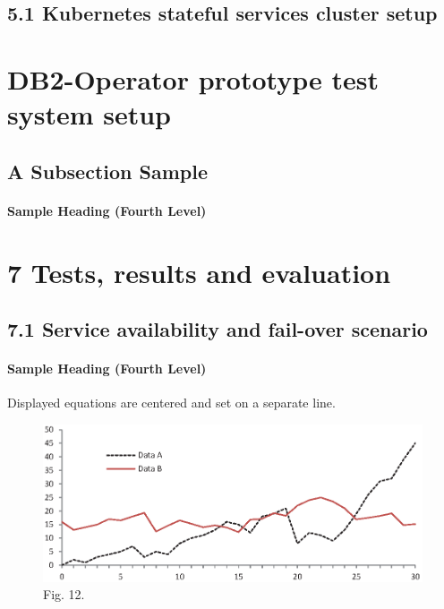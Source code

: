 \documentclass[runningheads]{llncs}
\begin{document}
\subsection{5.1	Kubernetes stateful services cluster setup}

\section{DB2-Operator prototype test system setup}
\subsection{A Subsection Sample}
\paragraph{Sample Heading (Fourth Level)}

\section{7	Tests, results and evaluation}

\subsection{7.1	Service availability and fail-over scenario}
\paragraph{Sample Heading (Fourth Level)}

\noindent Displayed equations are centered and set on a separate line.
\begin{figure}
\includegraphics[width=\textwidth]{fig1.eps}
\caption{Fig. 12.} \label{fig12}
\end{figure}
\end{document}
